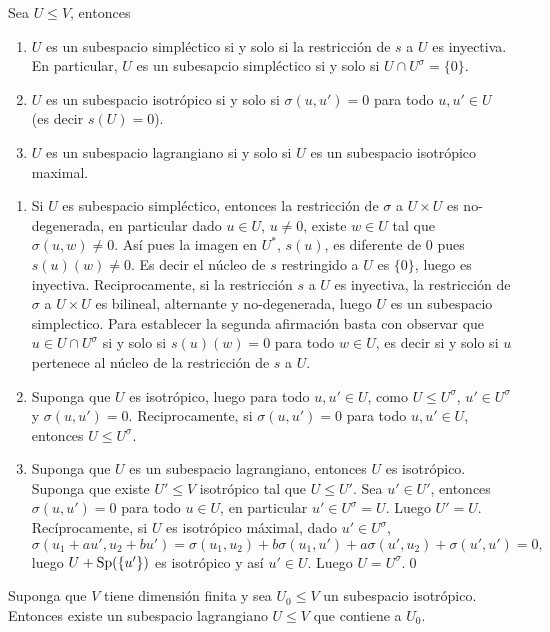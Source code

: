 \begin{prop}\label{propsimisolan}
Sea $U\le V$, entonces
\begin{enumerate}
\item $U$ es un subespacio simpl\'ectico si y solo si la restricci\'on de $s$ a $U$ es inyectiva. En particular, $U$ es un subesapcio simpl\'ectico si y solo si $U\cap U^\sigma=\{0\}$.
\item $U$ es un subespacio isotr\'opico si y solo si $\sigma(u,u')=0$ para todo $u,u'\in U$ (es decir $s(U)=0$).
\item $U$ es un subespacio lagrangiano si y solo si $U$ es un subespacio isotr\'opico maximal.
\end{enumerate}
\end{prop}

\dem
\begin{enumerate}
\item Si $U$ es subespacio simpl\'ectico, entonces la restricci\'on de $\sigma$ a $U\times U$ es no-degenerada, en particular dado $u\in U$, $u\ne 0$, existe $w\in U$ tal que $\sigma(u,w)\ne 0$. As\'i pues la imagen en $U^*$, $s(u)$, es diferente de $0$ pues $s(u)(w)\ne 0$. Es decir el n\'ucleo de $s$ restringido a $U$ es $\{0\}$, luego es inyectiva. Reciprocamente, si la restricci\'on $s$ a $U$ es inyectiva, la restricci\'on de $\sigma$ a $U\times U$ es bilineal, alternante y no-degenerada, luego $U$ es un subespacio simplectico. Para establecer la segunda afirmaci\'on basta con observar que $u\in U\cap U^\sigma$ si y solo si $s(u)(w)=0$ para todo $w\in U$, es decir si y solo si $u$ pertenece al n\'ucleo de la restricci\'on de $s$ a $U$.
\item Suponga que $U$ es isotr\'opico, luego para todo $u,u'\in U$, como $U\le U^\sigma$, $u'\in U^\sigma$ y $\sigma(u,u')=0$. Reciprocamente, si $\sigma(u,u')=0$ para todo $u,u'\in U$, entonces $U\le U^\sigma$.
\item Suponga que $U$ es un subespacio lagrangiano, entonces $U$ es isotr\'opico. Suponga que existe $U'\le V$ isotr\'opico tal que $U\le U'$. Sea $u'\in U'$, entonces $\sigma(u,u')=0$ para todo $u\in U$, en particular $u'\in U^\sigma=U$. Luego $U'=U$. Rec\'iprocamente, si $U$ es isotr\'opico m\'aximal, dado $u'\in U^\sigma$,
\[
\sigma(u_1+au',u_2+bu')=\sigma(u_1,u_2)+b\sigma(u_1,u')+a\sigma(u',u_2)+\sigma(u',u')=0,
\]
luego $U+\operatorname{Sp}(\{u'\})$ es isotr\'opico y as\'i $u'\in U$. Luego $U=U^\sigma$.\qed 
\end{enumerate}

\begin{pro}
Suponga que $V$ tiene dimensi\'on finita y sea $U_0\le V$ un subespacio isotr\'opico. Entonces existe un subespacio lagrangiano $U\le V$ que contiene a $U_0$.
\end{pro}

